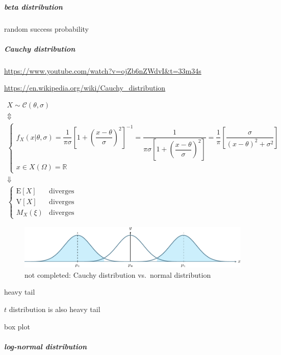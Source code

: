 \documentclass[
]{book}
\theoremstyle{definition}
\theoremstyle{definition}
\theoremstyle{definition}
\theoremstyle{definition}
\theoremstyle{remark}
\begin{document}
\subparagraph{beta distribution}\label{beta-distribution}

random success probability

\subparagraph{Cauchy distribution}\label{cauchy-distribution}

\url{https://www.youtube.com/watch?v=ojZb6nZWdvI&t=33m34s}

\url{https://en.wikipedia.org/wiki/Cauchy_distribution}

\[
\begin{array}{c}
X\sim\mathcal{C}\left(\theta,\sigma\right)\\
\Updownarrow\\
\begin{cases}
f_{{\scriptscriptstyle X}}\left(x|\theta,\sigma\right)=\dfrac{1}{\pi\sigma}\left[1+\left(\dfrac{x-\theta}{\sigma}\right)^{2}\right]^{-1}=\dfrac{1}{\pi\sigma\left[1+\left(\dfrac{x-\theta}{\sigma}\right)^{2}\right]}=\dfrac{1}{\pi}\left[\dfrac{\sigma}{\left(x-\theta\right)^{2}+\sigma^{2}}\right]\\
x\in X\left(\Omega\right)=\mathbb{R}
\end{cases}\\
\Downarrow\\
\begin{cases}
\mathrm{E}\left[X\right] & \text{diverges}\\
\mathrm{V}\left[X\right] & \text{diverges}\\
M_{{\scriptscriptstyle X}}\left(\xi\right) & \text{diverges}
\end{cases}
\end{array}
\]

\begin{figure}
\centering
\includegraphics{202402170031-statistics_files/figure-latex/unnamed-chunk-32-1.pdf}
\caption{\label{fig:unnamed-chunk-32}not completed: Cauchy distribution vs.~normal distribution}
\end{figure}

heavy tail

\(t\) distribution is also heavy tail

box plot

\subparagraph{log-normal distribution}\label{log-normal-distribution}
\end{document}
